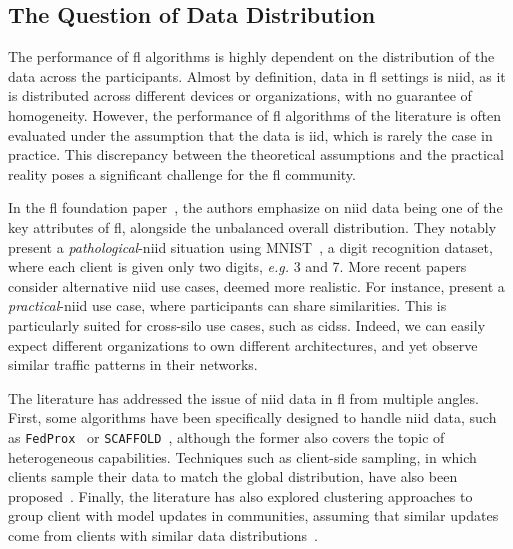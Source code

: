 \subsection{The Question of Data Distribution\label{sec:bg.fl.data}}


The performance of \gls{fl} algorithms is highly dependent on the distribution of the data across the participants.
Almost by definition, data in \gls{fl} settings is \gls{niid}, as it is distributed across different devices or organizations, with no guarantee of homogeneity.
However, the performance of \gls{fl} algorithms of the literature is often evaluated under the assumption that the data is \gls{iid}, which is rarely the case in practice.
This discrepancy between the theoretical assumptions and the practical reality poses a significant challenge for the \gls{fl} community.

In the \gls{fl} foundation paper~\cite{mcmahan_Communicationefficientlearningdeep_2017}, the authors emphasize on \gls{niid} data being one of the key attributes of \gls{fl}, alongside the unbalanced overall distribution.
They notably present a \emph{pathological}-\gls{niid} situation using MNIST~\cite{lecun_Gradientbasedlearningapplied_1998}, a digit recognition dataset, where each client is given only two digits, \emph{e.g.} 3 and 7.
More recent papers consider alternative \gls{niid} use cases, deemed more realistic.
For instance, \textcite{huang_PersonalizedCrossSiloFederated_2021} present a \emph{practical}-\gls{niid} use case, where participants can share similarities.
This is particularly suited for cross-silo use cases, such as \glspl{cids}.
Indeed, we can easily expect different organizations to own different architectures, and yet observe similar traffic patterns in their networks.

The literature has addressed the issue of \gls{niid} data in \gls{fl} from multiple angles.
First, some algorithms have been specifically designed to handle \gls{niid} data, such as \texttt{FedProx}~\cite{li_FederatedOptimizationHeterogeneous_2020} or \texttt{SCAFFOLD}~\cite{karimireddy_SCAFFOLDStochasticControlled_2020}, although the former also covers the topic of heterogeneous capabilities.
Techniques such as client-side sampling, in which clients sample their data to match the global distribution, have also been proposed~\cite{han_HeterogeneousDataAwareFederated_2024}.
Finally, the literature has also explored clustering approaches to group client with model updates in communities, assuming that similar updates come from clients with similar data distributions~\cite{ye_PFedSAPersonalizedFederated_2023}.



